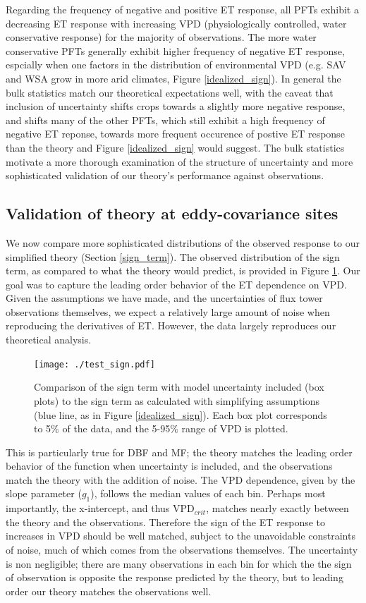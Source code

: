\documentclass[draft,linenumbers]{agujournal}
\begin{document}
Regarding the frequency of negative and positive ET response, all PFTs exhibit a  decreasing ET response with increasing VPD (physiologically controlled, water conservative response) for the majority of observations. The more water conservative PFTs generally exhibit higher frequency of negative ET response, espcially when one factors in the distribution of environmental VPD (e.g. SAV and WSA grow in more arid climates, Figure \ref{idealized_sign}). In general the bulk statistics match our theoretical expectations well, with the caveat that inclusion of uncertainty shifts crops towards a slightly more negative response, and shifts many of the other PFTs, which still exhibit a high frequency of negative ET reponse, towards more frequent occurence of postive ET response than the theory and Figure \ref{idealized_sign} would suggest. The bulk statistics motivate a more thorough examination of the structure of uncertainty and more sophisticated validation of our theory's performance against observations. 

\subsection{Validation of theory at eddy-covariance sites}
\label{testing}
We now compare more sophisticated distributions of the observed response to our simplified theory (Section \ref{sign_term}). The observed distribution of the sign term, as compared to what the theory would predict, is provided in Figure \ref{test_sign}. Our goal was to capture the leading order behavior of the ET dependence on VPD. Given the assumptions we have made, and the uncertainties of flux tower observations themselves, we expect a relatively large amount of noise when reproducing the derivatives of ET. However, the data largely reproduces our theoretical analysis.

\begin{figure}
\centering
\centerline{\texttt{[image: ./test\_sign.pdf]}}
\caption{Comparison of the sign term with model uncertainty included (box plots) to the sign term as calculated with simplifying assumptions (blue line, as in Figure \ref{idealized_sign}). Each box plot corresponds to 5\% of the data, and the 5-95\% range of VPD is plotted.}
\label{test_sign}
\end{figure}

This is particularly true for DBF and MF; the theory matches the leading order behavior of the function when uncertainty is included, and the observations match the theory with the addition of noise. The VPD dependence, given by the slope parameter ($g_1$), follows the median values of each bin. Perhaps most importantly, the x-intercept, and thus VPD$_{crit}$, matches nearly exactly between the theory and the observations. Therefore the sign of the ET response to increases in VPD should be well matched, subject to the unavoidable constraints of noise, much of which comes from the observations themselves. The uncertainty is non negligible; there are many observations in each bin for which the the sign of observation is opposite the response predicted by the theory, but to leading order our theory matches the observations well.
\end{document}
